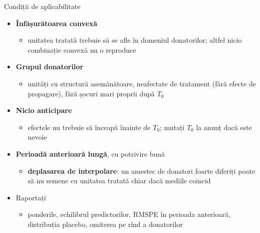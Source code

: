 \begin{frame}{Condiții de aplicabilitate}
\itemsize{\small}
\begin{itemize}
    \item \textbf{Înfășurătoarea convexă} 
    \begin{itemize}
        \item unitatea tratată trebuie să se afle în domeniul donatorilor; altfel nicio combinație convexă nu o reproduce
    \end{itemize}
    \item \textbf{Grupul donatorilor}
    \begin{itemize}
        \item unități cu structură asemănătoare, neafectate de tratament (fără efecte de propagare), fără șocuri mari proprii după $T_0$
    \end{itemize}
    \item \textbf{Nicio anticipare}
    \begin{itemize}
        \item efectele nu trebuie să înceapă înainte de $T_0$; mutați $T_0$ la anunț dacă este nevoie
    \end{itemize}
    \item \textbf{Perioadă anterioară lungă}, cu potrivire bună
    \begin{itemize}
        \item \textbf{deplasarea de interpolare}: un amestec de donatori foarte diferiți poate să nu semene cu unitatea tratată chiar dacă mediile coincid
    \end{itemize}
    \item Raportați
    \begin{itemize}
        \item ponderile, echilibrul predictorilor, RMSPE în perioada anterioară, distribuția placebo, omiterea pe rînd a donatorilor
    \end{itemize}
\end{itemize}
\end{frame}

